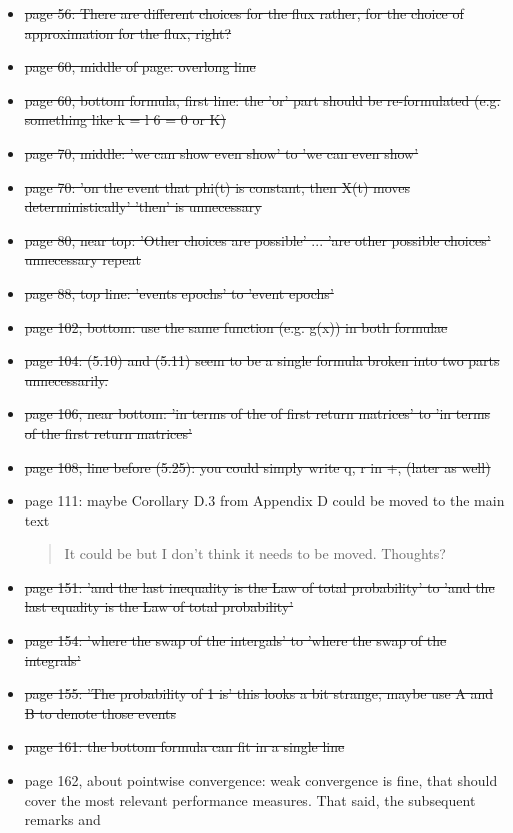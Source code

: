 \documentclass[a4paper]{article}
\begin{document}
\begin{itemize}
\begin{quote}
\end{quote}
\item \st{page 56: There are different choices for the flux rather, for the choice of approximation for the flux, right?}
\item \st{page 60, middle of page: overlong line}
\item \st{page 60, bottom formula, first line: the 'or' part should be re-formulated (e.g.
something like k = l 6 = 0 or K)}
\item \st{page 70, middle: 'we can show even show' to 'we can even show'}
\item \st{page 70: 'on the event that phi(t) is constant, then X(t) moves deterministically' 'then' is unnecessary}
\item \st{page 80, near top: 'Other choices are possible' ... 'are other possible choices' unnecessary repeat}
\item \st{page 88, top line: 'events epochs' to 'event epochs'}
\item \st{page 102, bottom: use the same function (e.g. g(x)) in both formulae}
\item \st{page 104: (5.10) and (5.11) seem to be a single formula broken into two parts
unnecessarily.}
\item \st{page 106, near bottom: 'in terms of the of first return matrices' to 'in terms of the
first return matrices'}
\item \st{page 108, line before (5.25): you could simply write q, r in +, (later as well)}
\item page 111: maybe Corollary D.3 from Appendix D could be moved to the main text
\begin{quote}
    It could be but I don't think it needs to be moved. Thoughts?
\end{quote}
\item \st{page 151: 'and the last inequality is the Law of total probability' to 'and the last
equality is the Law of total probability'}
\item \st{page 154: 'where the swap of the intergals' to 'where the swap of the integrals'}
\item \st{page 155: 'The probability of 1 is' this looks a bit strange, maybe use A and B to
denote those events}
\item \st{page 161: the bottom formula can fit in a single line}
\item page 162, about pointwise convergence: weak convergence is fine, that should cover
the most relevant performance measures. That said, the subsequent remarks and

\end{itemize}
\end{document}
